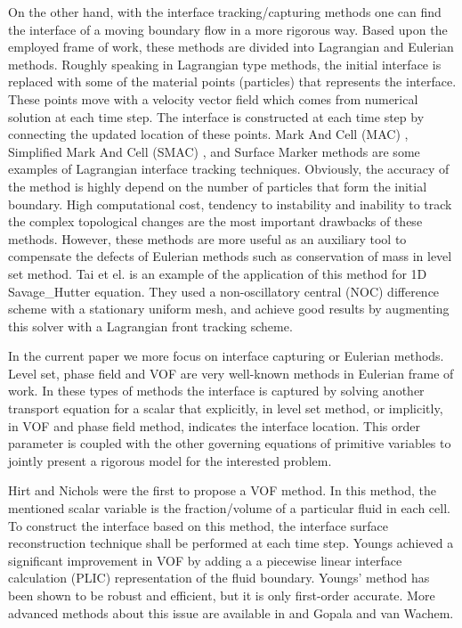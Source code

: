 \documentclass[letterpaper,10pt]{article}
\begin{document}
On the other hand, with the interface tracking/capturing methods one can find the interface of a moving boundary flow in a more rigorous way. Based upon the employed frame of work, these methods are divided into Lagrangian and Eulerian methods.
Roughly speaking in Lagrangian type methods, the initial interface is replaced with some of the material points (particles) that represents the interface. These points move with a velocity vector field which comes from numerical solution at each time step. The interface is constructed at each time step by connecting the updated location of these points. 
Mark And Cell (MAC) \cite{Harlow1965}, Simplified Mark And Cell (SMAC)  \cite{Cheng1995}, and Surface Marker \citep{Wrobel1991} methods are some examples of Lagrangian interface tracking techniques.
Obviously, the accuracy of the method is highly depend on the number 
of particles that form the initial boundary. 
High computational cost, tendency to instability and inability to track the complex topological changes are the most important drawbacks of these methods. 
However, these methods are more useful as an auxiliary tool to compensate the defects of Eulerian methods such as conservation of mass in level set method. Tai et el. \cite{Tai2002} is an example of the application of this method for 1D Savage\_Hutter equation. They used a non-oscillatory central (NOC) difference scheme with a stationary uniform mesh, and achieve good results by augmenting this solver with a Lagrangian front tracking scheme.\newline

In the current paper we more focus on interface capturing or Eulerian methods. Level set, phase field and VOF are very well-known methods in Eulerian frame of work.
In these types of methods the interface is captured by solving another transport equation for a scalar that explicitly, in level set method, or implicitly, in VOF and phase field method, indicates the interface location.
This order parameter is coupled with the other governing equations of primitive variables to jointly present a rigorous model for the interested problem.\newline



Hirt and Nichols \cite{hirt1981vfv} were the first to propose a VOF method. 
In this method, the mentioned scalar variable is the fraction/volume of a particular fluid in each cell.
To construct the interface based on this method, the interface surface reconstruction technique shall be performed at each time step. Youngs \cite{youngs1982tdm} achieved a significant improvement in VOF by adding a 
a piecewise linear interface calculation (PLIC) representation of the fluid boundary.  
Youngs' method has been shown to be robust and efficient, but it is only first-order accurate. More advanced methods about this issue are available in \cite{gerlach2006cvf} and Gopala and van Wachem\cite{gopala2008vfm}. 
\end{document}
